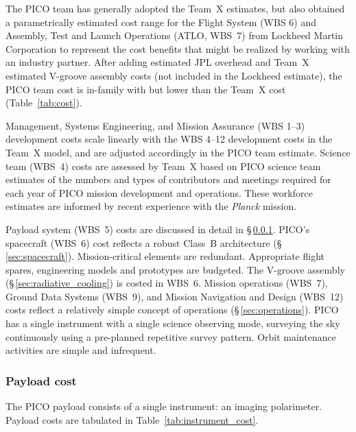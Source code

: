 The PICO team has generally adopted the Team~X estimates, but also
obtained a parametrically estimated cost range for the Flight System
(WBS 6) and Assembly, Test and Launch Operations (ATLO, WBS~7) from
Lockheed Martin Corporation to represent the cost benefits that might
be realized by working with an industry partner. After adding
estimated JPL overhead and Team~X estimated V-groove assembly costs
(not included in the Lockheed estimate), the PICO team cost is
in-family with but lower than the Team~X cost (Table~\ref{tab:cost}).

Management, Systems Engineering, and Mission Assurance (WBS 1--3)
development costs scale linearly with the WBS 4--12 development costs
in the Team~X model, and are adjusted accordingly in the PICO team
estimate. Science team (WBS~4) costs are assessed by Team~X based on PICO
science team estimates of the numbers and types of contributors and
meetings required for each year of PICO mission development and
operations. These workforce estimates are informed by recent
experience with the \textit{Planck} mission.

Payload system (WBS~5) costs are discussed in detail in
\S\,\ref{sec:instrument_cost}.  PICO's spacecraft (WBS~6) cost
reflects a robust Class~B architecture
(\S\,\ref{sec:spacecraft}). Mission-critical elements are
redundant. Appropriate flight spares, engineering models and
prototypes are budgeted. The V-groove assembly (\S\,\ref{sec:radiative_cooling})
is costed in WBS~6.  Mission operations (WBS~7), Ground Data Systems
(WBS~9), and Mission Navigation and Design (WBS~12) costs reflect a
relatively simple concept of operations (\S\,\ref{sec:operations}). PICO has a single
instrument with a single science observing mode, surveying the sky
continuously using a pre-planned repetitive survey pattern. Orbit
maintenance activities are simple and infrequent.

\subsubsection{Payload cost}
\label{sec:instrument_cost} %

The PICO payload consists of a single instrument: an imaging
polarimeter. Payload costs are tabulated in
Table~\ref{tab:instrument_cost}.

